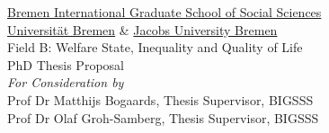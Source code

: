 

\begin{center}


\vspace*{\fill}

	{\Large \href{http://www.bigsss-bremen.de}{Bremen International Graduate School of Social Sciences}}
	\\
	{\Large \href{http://www.uni-bremen.de}{Universit\"at Bremen} \& \href{http://www.jacobs-university.de}{Jacobs University Bremen}}
	\\ 
	\vspace{15pt}
	{\Large Field B: Welfare State, Inequality and Quality of Life}
	\\
	\vspace{50pt} 
	{\Large PhD Thesis Proposal}
	\\ 	
	\vspace{30pt}
	{\Large \emph{For Consideration by}} 
	\\ 
	\vspace{30pt}
	{\large Prof Dr Matthijs Bogaards, Thesis Supervisor, BIGSSS}
	\\
	{\large Prof Dr Olaf Groh-Samberg, Thesis Supervisor, BIGSSS}
	\\ 
	\vspace{10pt}
	\vspace{30pt} 

\vspace*{\fill}

\end{center}
	
